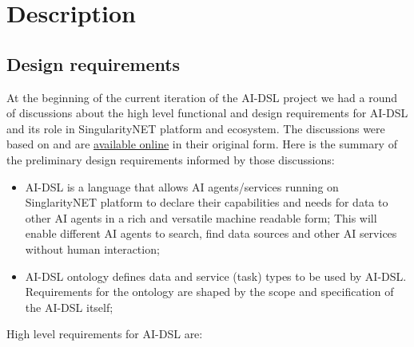 \documentclass[]{report}
\begin{document}
\section{Description}

\subsection{Design requirements}
\label{design-requirements}

At the beginning of the current iteration of the AI-DSL project we had a round
of discussions about the high level functional and design requirements for
AI-DSL and its role in SingularityNET platform and ecosystem. The discussions
were based on
\cite{GoertzelGeisweillerBlog,singularitynet_foundation_phasetwo_2021}  and are
\href{https://github.com/nunet-io/ai-dsl-ontology/wiki/AI-DSL\%20requirements}{available
online} in their original form. Here is the summary of the preliminary design
requirements informed by those discussions:

\begin{itemize} \item AI-DSL is a language that allows AI agents/services
running on SinglarityNET platform to declare their capabilities and needs for
data to other AI agents in a rich and versatile machine readable form; This will
enable different AI agents to search, find data sources and other AI services
without human interaction; \item AI-DSL ontology defines data and service
(task) types to be used by AI-DSL. Requirements for the ontology are shaped by
the scope and specification of the AI-DSL itself; \end{itemize}

High level requirements for AI-DSL are:
\end{document}
